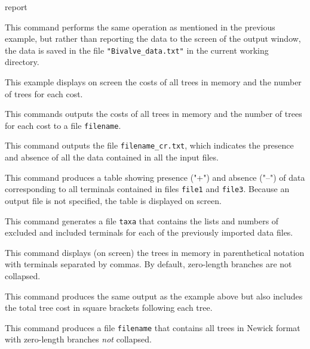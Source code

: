 \begin{command}{report}{}
\begin{poyexamples}
            {This command performs the same operation as mentioned in the previous example,
            but rather than reporting the data to the screen of the output window, the data
            is saved in the file \texttt{"Bivalve\_data.txt"} in the current working directory.}
        
            {This example displays on screen the costs of all trees in memory and the
            number of trees for each cost.}

            {This commands outputs the costs of all trees in memory and the
            number of trees for each cost to a file \texttt{filename}.}
    
            {This command outputs the file \texttt{filename\_cr.txt}, which indicates 
            the presence and absence of all the data contained in all the input files.}
    
            {This command produces a table showing presence ("+")
            and absence ("--") of data corresponding to all terminals contained
            in files \texttt{file1} and \texttt{file3}. Because an output
            file is not specified, the table is displayed on screen.}

            {This command generates a file \texttt{taxa} that contains the
            lists and numbers of excluded and included terminals for each of the
            previously imported data files.}

            {This command displays (on screen) the trees in memory in parenthetical
            notation with terminals separated by commas.  By default, zero-length branches 
            are not collapsed.}

            {This command produces the same output as the example above
            but also includes the total tree cost in square brackets
            following each tree.}

            {This command produces a file \texttt{filename} that contains
            all trees in Newick format with zero-length branches \emph{not}
            collapsed.}
    

\end{poyexamples}
\end{command}
